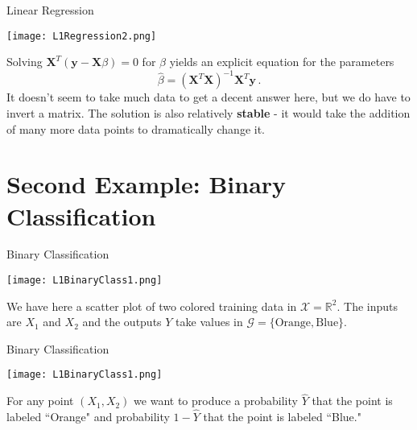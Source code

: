 \documentclass[10pt, handout]{beamer}
\begin{document}
\begin{frame}[fragile]{Linear Regression}
  \begin{minipage}[t][0.5\textheight][t]{\textwidth}
    \centering
     \texttt{[image: L1Regression2.png]}
  \end{minipage}
  \vfill
  \begin{minipage}[t][0.5\textheight][t]{\textwidth}
Solving $\mathbf{X}^T(\mathbf{y} - \mathbf{X}\beta) = 0$ for $\beta$ yields an explicit equation for the parameters
$$
\hat\beta = (\mathbf{X}^T\mathbf{X})^{-1}\mathbf{X}^T\mathbf{y}\,.
$$
It doesn't seem to take much data to get a decent answer here, but we do have to invert a matrix. The solution is also relatively \textbf{stable} - it would take the addition of many more data points to dramatically change it.
  \end{minipage}
\end{frame}




\section{Second Example: Binary Classification}


\begin{frame}[fragile]{Binary Classification}
  \begin{minipage}[t][0.5\textheight][t]{\textwidth}
    \centering
     \texttt{[image: L1BinaryClass1.png]}
  \end{minipage}
  \vfill
  \begin{minipage}[t][0.5\textheight][t]{\textwidth}
We have here a scatter plot of two colored training data in $\mathcal{X} = \mathbb{R}^2$. The inputs are $X_1$ and $X_2$ and the outputs $Y$ take values in $\mathcal{G} = \{\text{Orange}, \text{Blue}\}$. 
  \end{minipage}
\end{frame}



\begin{frame}[fragile]{Binary Classification}
  \begin{minipage}[t][0.5\textheight][t]{\textwidth}
    \centering
     \texttt{[image: L1BinaryClass1.png]}
  \end{minipage}
  \vfill
  \begin{minipage}[t][0.5\textheight][t]{\textwidth}
For any point $(X_1,X_2)$ we want to produce a probability $\hat Y$ that the point is labeled ``Orange" and probability $1-\hat{Y}$ that the point is labeled ``Blue."
  \end{minipage}
\end{frame}
\end{document}
